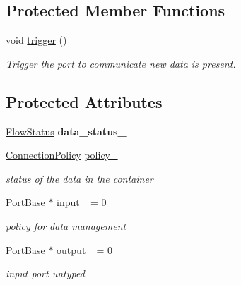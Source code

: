 \subsection*{Protected Member Functions}
\begin{DoxyCompactItemize}
\item 
\hypertarget{classcoco_1_1_connection_base_a48861f5913490df52b2a741a51275293}{}void \hyperlink{classcoco_1_1_connection_base_a48861f5913490df52b2a741a51275293}{trigger} ()\label{classcoco_1_1_connection_base_a48861f5913490df52b2a741a51275293}

\begin{DoxyCompactList}\small\item\em Trigger the port to communicate new data is present. \end{DoxyCompactList}\end{DoxyCompactItemize}
\subsection*{Protected Attributes}
\begin{DoxyCompactItemize}
\item 
\hypertarget{classcoco_1_1_connection_base_a526b0954719f06db131e3e5d00687aef}{}\hyperlink{namespacecoco_a057be58377e415c9be98c1dc5c8426ad}{Flow\+Status} {\bfseries data\+\_\+status\+\_\+}\label{classcoco_1_1_connection_base_a526b0954719f06db131e3e5d00687aef}

\item 
\hypertarget{classcoco_1_1_connection_base_a64e625d75ed25b17039caa39847a45d9}{}\hyperlink{structcoco_1_1_connection_policy}{Connection\+Policy} \hyperlink{classcoco_1_1_connection_base_a64e625d75ed25b17039caa39847a45d9}{policy\+\_\+}\label{classcoco_1_1_connection_base_a64e625d75ed25b17039caa39847a45d9}

\begin{DoxyCompactList}\small\item\em status of the data in the container \end{DoxyCompactList}\item 
\hypertarget{classcoco_1_1_connection_base_aa8866747c7325f4605d42d53bd0224ef}{}\hyperlink{classcoco_1_1_port_base}{Port\+Base} $\ast$ \hyperlink{classcoco_1_1_connection_base_aa8866747c7325f4605d42d53bd0224ef}{input\+\_\+} = 0\label{classcoco_1_1_connection_base_aa8866747c7325f4605d42d53bd0224ef}

\begin{DoxyCompactList}\small\item\em policy for data management \end{DoxyCompactList}\item 
\hypertarget{classcoco_1_1_connection_base_a2f5548815a384f99068543b94a9750f5}{}\hyperlink{classcoco_1_1_port_base}{Port\+Base} $\ast$ \hyperlink{classcoco_1_1_connection_base_a2f5548815a384f99068543b94a9750f5}{output\+\_\+} = 0\label{classcoco_1_1_connection_base_a2f5548815a384f99068543b94a9750f5}

\begin{DoxyCompactList}\small\item\em input port untyped \end{DoxyCompactList}\end{DoxyCompactItemize}


